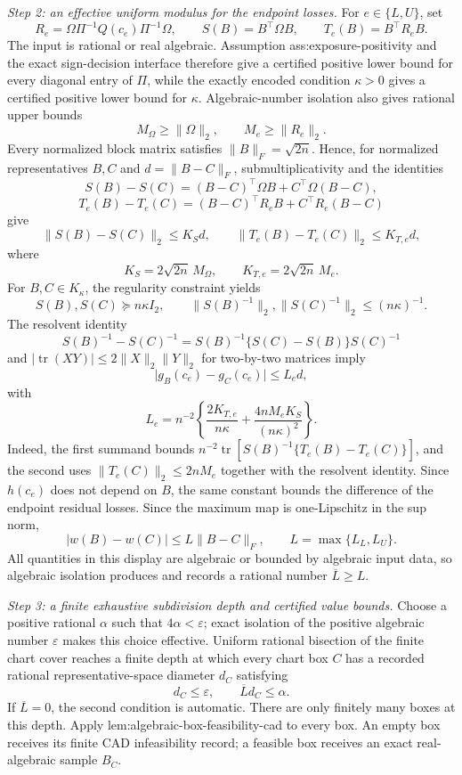 \emph{Step 2: an effective uniform modulus for the endpoint losses.}
For \(e\in\{L,U\}\), set
\[
 R_e=\Omega\Pi^{-1}Q(c_e)\Pi^{-1}\Omega,
 \qquad S(B)=B^{\top}\Omega B,
 \qquad T_e(B)=B^{\top}R_eB.
\]
The input is rational or real algebraic.  Assumption ass:exposure-positivity and the exact sign-decision interface therefore give a certified positive lower bound for every diagonal entry of \(\Pi\), while the exactly encoded condition \(\kappa>0\) gives a certified positive lower bound for \(\kappa\).  Algebraic-number isolation also gives rational upper bounds
\[
 M_\Omega\ge\lVert\Omega\rVert_2,
 \qquad M_e\ge\lVert R_e\rVert_2.
\]
Every normalized block matrix satisfies \(\lVert B\rVert_F=\sqrt{2n}\).  Hence, for normalized representatives \(B,C\) and \(d=\lVert B-C\rVert_F\), submultiplicativity and the identities
\[
 S(B)-S(C)=(B-C)^{\top}\Omega B+C^{\top}\Omega(B-C),
\]
\[
 T_e(B)-T_e(C)=(B-C)^{\top}R_eB+C^{\top}R_e(B-C)
\]
give
\[
 \lVert S(B)-S(C)\rVert_2\le K_Sd,
 \qquad
 \lVert T_e(B)-T_e(C)\rVert_2\le K_{T,e}d,
\]
where
\[
 K_S=2\sqrt{2n}\,M_\Omega,
 \qquad K_{T,e}=2\sqrt{2n}\,M_e.
\]
For \(B,C\in K_\kappa\), the regularity constraint yields
\[
 S(B),S(C)\succeq n\kappa I_2,
 \qquad
 \lVert S(B)^{-1}\rVert_2,\lVert S(C)^{-1}\rVert_2\le(n\kappa)^{-1}.
\]
The resolvent identity
\[
 S(B)^{-1}-S(C)^{-1}
 =S(B)^{-1}\{S(C)-S(B)\}S(C)^{-1}
\]
and \(\lvert\operatorname{tr}(XY)\rvert\le2\lVert X\rVert_2\lVert Y\rVert_2\) for two-by-two matrices imply
\[
 \lvert g_B(c_e)-g_C(c_e)\rvert
 \le L_ed,
\]
with
\[
 L_e=n^{-2}\left\{
 \frac{2K_{T,e}}{n\kappa}
 +\frac{4nM_eK_S}{(n\kappa)^2}
 \right\}.
\]
Indeed, the first summand bounds
\(n^{-2}\operatorname{tr}[S(B)^{-1}\{T_e(B)-T_e(C)\}]\), and the second uses \(\lVert T_e(C)\rVert_2\le2nM_e\) together with the resolvent identity.  Since \(h(c_e)\) does not depend on \(B\), the same constant bounds the difference of the endpoint residual losses.  Since the maximum map is one-Lipschitz in the sup norm,
\[
 \lvert w(B)-w(C)\rvert
 \le L\lVert B-C\rVert_F,
 \qquad L=\max\{L_L,L_U\}. \tag{1}
\]
All quantities in this display are algebraic or bounded by algebraic input data, so algebraic isolation produces and records a rational number \(\overline L\ge L\).

\emph{Step 3: a finite exhaustive subdivision depth and certified value bounds.}
Choose a positive rational \(\alpha\) such that \(4\alpha<\varepsilon\); exact isolation of the positive algebraic number \(\varepsilon\) makes this choice effective.  Uniform rational bisection of the finite chart cover reaches a finite depth at which every chart box \(C\) has a recorded rational representative-space diameter \(d_C\) satisfying
\[
 d_C\le\varepsilon,
 \qquad \overline Ld_C\le\alpha. \tag{2}
\]
If \(\overline L=0\), the second condition is automatic.  There are only finitely many boxes at this depth.  Apply lem:algebraic-box-feasibility-cad to every box.  An empty box receives its finite CAD infeasibility record; a feasible box receives an exact real-algebraic sample \(B_C\).

